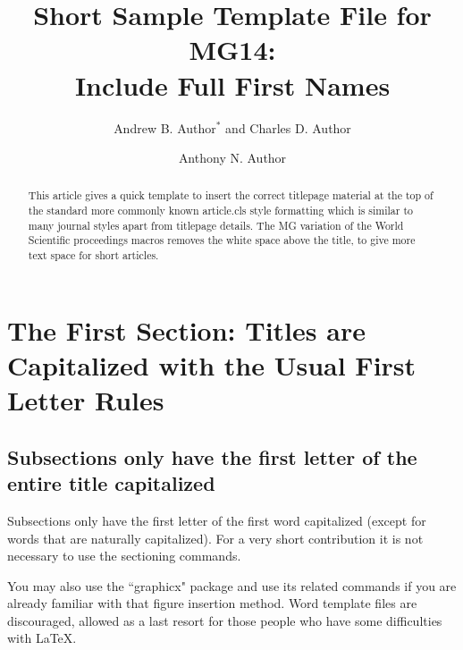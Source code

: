 \documentclass{ws-procs975x65}
\begin{document}
\title{Short Sample Template File for MG14: \\ Include Full First Names}
\author{Andrew B. Author$^*$ and Charles D. Author}

\address{University Department, University Name,\\
City, State ZIP/Zone, Country\\
$^*$E-mail: ab\_author@university.com\\
www.university\_name.edu}

\author{Anthony N. Author} 

\address{Group, Laboratory, Street,\\
City, State ZIP/Zone, Country\\
E-mail: an\_author@laboratory.com}

\begin{abstract}
This article gives a quick template to insert the correct titlepage 
material at the top of the standard more commonly known article.cls style formatting which is similar to many journal styles apart from titlepage details. The MG variation of the World Scientific proceedings macros removes the white space above the title, to give more text space for short articles.
\end{abstract}


\bodymatter


\section{The First Section: Titles are Capitalized with the Usual First Letter Rules}
\subsection{Subsections only have the first letter of the entire title capitalized}

Subsections only have the first letter of the first word capitalized (except for words that are naturally capitalized). For a very short contribution it is not necessary to use the sectioning commands.

You may also use the ``graphicx" package and use its related commands if you are already familiar with that figure insertion method. Word template files are discouraged, allowed as a last resort for those people who have some difficulties with \LaTeX.
\end{document}
